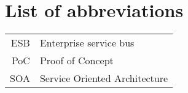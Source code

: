 \documentclass[english,master,unicode,bw]{ctufit-thesis}
\theoremstyle{plain}
\theoremstyle{definition}
\theoremstyle{remark}
\numberwithin{theorem}{chapter}
\begin{document}






\chapter{List of abbreviations}

\begin{tabular}{rl}
    ESB   & Enterprise service bus                 \\
    PoC   & Proof of Concept                 \\
    SOA   & Service Oriented Architecture                 \\
\end{tabular}
\end{document}

